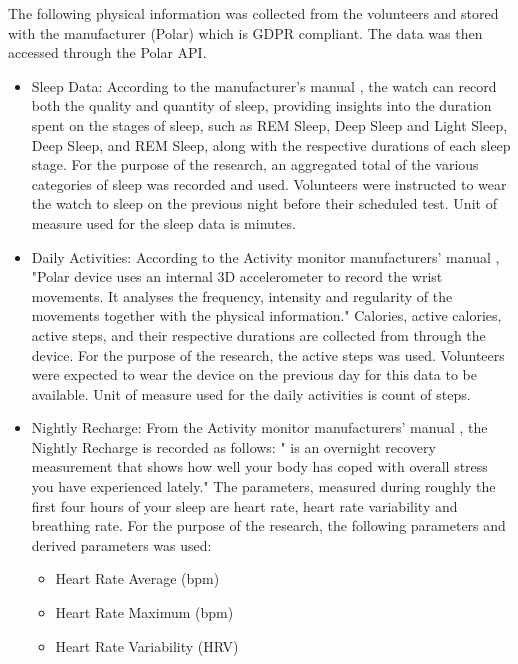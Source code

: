 The following physical information was collected from the volunteers and stored with the manufacturer (Polar) which is GDPR compliant. The data was then accessed through the Polar API.

\begin{itemize}
    \item Sleep Data: According to the manufacturer's manual \cite{polarManual}, the watch can record both the quality and quantity of sleep, providing insights into
    the duration spent on the stages of sleep, such as REM Sleep, Deep Sleep and Light Sleep, Deep Sleep, and REM Sleep, along with the respective durations of each sleep stage. For the purpose of the research, an aggregated total of the various categories of sleep was 
    recorded and used.
    Volunteers were instructed to wear the watch to sleep on the previous night before their scheduled test. Unit of measure used for the sleep data is minutes. 
    \item Daily Activities: According to the Activity monitor manufacturers' manual \cite{polarManual}, "Polar device uses an internal 3D accelerometer to record the wrist movements. It analyses the frequency, 
    intensity and regularity of the movements together with the physical information." Calories, active calories, active steps, and their respective durations are collected from through the device. For the 
    purpose of the research, the active steps was used. Volunteers were expected to wear the device on the previous day for this data to be available. Unit of measure used for the daily activities is count of steps.
    \item Nightly Recharge: From the Activity monitor manufacturers' manual \cite{polarManual}, the Nightly Recharge is recorded as follows: " is an overnight recovery measurement that shows how well your body has
    coped with overall stress you have experienced lately." The parameters, measured during roughly the first four hours of your sleep are heart rate, heart rate variability and breathing rate. For the purpose 
    of the research, the following parameters and derived parameters was used:
    \begin{itemize}
        \item Heart Rate Average (bpm)
        \item Heart Rate Maximum (bpm)
        \item Heart Rate Variability (HRV)
    \end{itemize}
\end{itemize}

